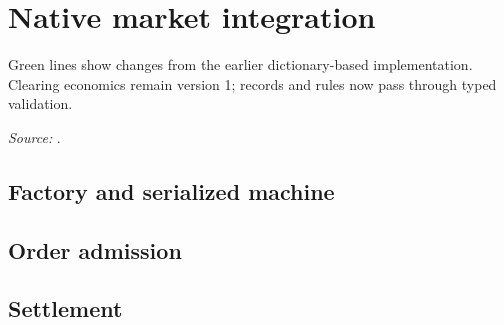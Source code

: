 \section{Native market integration}
Green lines show changes from the earlier dictionary-based implementation. Clearing economics remain version 1; records and rules now pass through typed validation.
\par\textit{Source:} .
\def\activefile{market}
\subsection{Factory and serialized machine}

\subsection{Order admission}

\subsection{Settlement}

